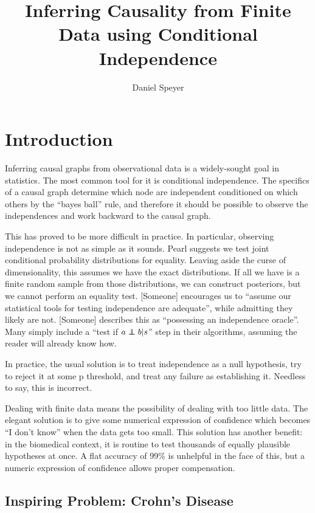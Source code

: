 \documentclass[twocolumn,12pt]{article}
\title{Inferring Causality from Finite Data using Conditional Independence}
\author{Daniel Speyer}
\newcommand\indep{\protect\mathpalette{\protect\independenT}{\perp}}
\def\independenT#1#2{\mathrel{\rlap{$#1#2$}\mkern2mu{#1#2}}}
\begin{document}
\maketitle

\section{Introduction}

Inferring causal graphs from observational data is a widely-sought
goal in statistics.  The most common tool for it is conditional
independence.  The specifics of a causal graph determine which node
are independent conditioned on which others by the ``bayes ball''
rule, and therefore it should be possible to observe the independences
and work backward to the causal graph.

This has proved to be more difficult in practice.  In particular,
observing independence is not as simple as it sounds.  Pearl suggests
we test joint conditional probability distributions for equality.
Leaving aside the curse of dimensionality, this assumes we have the
exact distributions.  If all we have is a finite random sample from
those distributions, we can construct posteriors, but we cannot perform
an equality test.  [Someone] encourages us to ``assume our statistical
tools for testing independence are adequate'', while admitting they
likely are not.  [Someone] describes this as ``possessing an
independence oracle''.  Many simply include a ``test if $a\indep
b|s$'' step in their algorithms, assuming the reader will already know
how.

In practice, the usual solution is to treat independence as a null
hypothesis, try to reject it at some p threshold, and treat any
failure as establishing it.  Needless to say, this is incorrect.

Dealing with finite data means the possibility of dealing with too
little data.  The elegant solution is to give some numerical
expression of confidence which becomes ``I don't know'' when the data
gets too small.  This solution has another benefit: in the biomedical
context, it is routine to test thousands of equally plausible
hypotheses at once.  A flat accuracy of 99\% is unhelpful in the face
of this, but a numeric expression of confidence allows proper
compensation.

\subsection{Inspiring Problem: Crohn's Disease}
\end{document}
